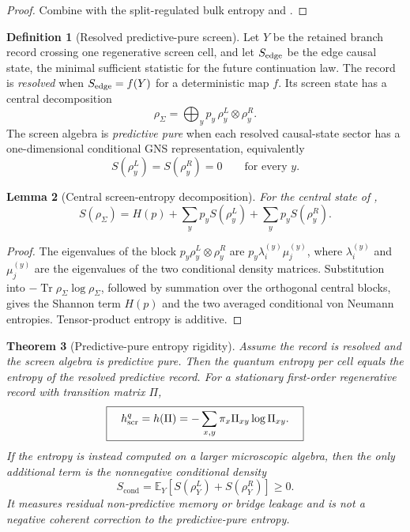 \documentclass[11pt]{article}
\newtheorem{theorem}{Theorem}[section]
\newtheorem{lemma}[theorem]{Lemma}
\theoremstyle{definition}
\newtheorem{definition}[theorem]{Definition}
\theoremstyle{remark}
\newcommand{\Tr}{\operatorname{Tr}}
\newcommand{\Scond}{S_{\mathrm{cond}}}
\begin{document}
\begin{proof}
Combine  with the split-regulated bulk entropy
and .
\end{proof}

\begin{definition}[Resolved predictive-pure screen]
\label{def:predictive-pure-screen}
Let \(Y\) be the retained branch record crossing one regenerative screen cell,
and let \(S_{\rm edge}\) be the edge causal state, the minimal sufficient
statistic for the future continuation law.  The record is \emph{resolved} when
\(S_{\rm edge}=f(Y)\) for a deterministic map \(f\).  Its screen state has a
central decomposition
\[
 \rho_\Sigma=\bigoplus_y p_y\,\rho_y^L\otimes\rho_y^R.
\]
The screen algebra is \emph{predictive pure} when each resolved causal-state
sector has a one-dimensional conditional GNS representation, equivalently
\[
   S(\rho_y^L)=S(\rho_y^R)=0
   \qquad\text{for every }y .
\]
\end{definition}

\begin{lemma}[Central screen-entropy decomposition]
\label{lem:central-screen-entropy}
For the central state of ,
\[
 \boxed{\;
 S(\rho_\Sigma)
 =H(p)+\sum_y p_yS(\rho_y^L)+\sum_y p_yS(\rho_y^R).
 \;}
\]
\end{lemma}

\begin{proof}
The eigenvalues of the block
\(p_y\rho_y^L\otimes\rho_y^R\) are \(p_y\lambda_i^{(y)}\mu_j^{(y)}\),
where \(\lambda_i^{(y)}\) and \(\mu_j^{(y)}\) are the eigenvalues of the two
conditional density matrices.  Substitution into
\(-\Tr\rho_\Sigma\log\rho_\Sigma\), followed by summation over the orthogonal
central blocks, gives the Shannon term \(H(p)\) and the two averaged conditional
von Neumann entropies.  Tensor-product entropy is additive.
\end{proof}

\begin{theorem}[Predictive-pure entropy rigidity]
\label{thm:predictive-pure-entropy}
Assume the record is resolved and the screen algebra is predictive pure.  Then
the quantum entropy per cell equals the entropy of the resolved predictive
record.  For a stationary first-order regenerative record with transition
matrix \(\Pi\),
\[
 \boxed{\quad
 h_{\rm scr}^{q}
 =h(\Pi)
 =-\sum_{x,y}\pi_x\Pi_{xy}\log\Pi_{xy}.
 \quad}
\]
If the entropy is instead computed on a larger microscopic algebra, then the
only additional term is the nonnegative conditional density
\[
 \Scond
 =\mathbb E_Y\!\left[S(\rho_Y^L)+S(\rho_Y^R)\right]\ge0.
\]
It measures residual non-predictive memory or bridge leakage and is not a
negative coherent correction to the predictive-pure entropy.
\end{theorem}
\end{document}
